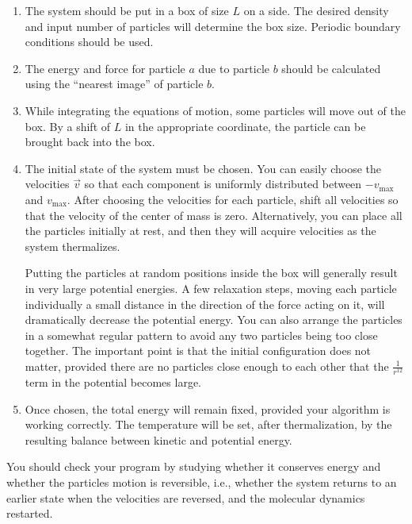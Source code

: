 \begin{enumerate}
    \item The system should be put in a box of size \(L\) on a side. The desired density and
          input number of particles will determine the box size. Periodic boundary
          conditions should be used.
    \item The energy and force for particle \(a\) due to particle \(b\) should be calculated
          using the ``nearest image'' of particle \(b\).
    \item While integrating the equations of motion, some particles will move out of the
          box. By a shift of \(L\) in the appropriate coordinate, the particle can be brought
          back into the box.
    \item The initial state of the system must be chosen. You can easily choose the
          velocities \(\vec{v}\) so that each component is uniformly distributed between
          \(-v_\text{max}\) and \(v_\text{max}\). After choosing the velocities for each
          particle, shift all velocities so that the velocity of the center of mass is zero.
          Alternatively, you can place all the particles initially at rest, and then they
          will acquire velocities as the system thermalizes.

          Putting the particles at random positions inside the box will generally result in
          very large potential energies. A few relaxation steps, moving each particle
          individually a small distance in the direction of the force acting on it, will
          dramatically decrease the potential energy. You can also arrange the particles in
          a somewhat regular pattern to avoid any two particles being too close together.
          The important point is that the initial configuration does not matter, provided
          there are no particles close enough to each other that the \(\frac{ 1 }{ r^{12} }\)
          term in the potential becomes large.
    \item Once chosen, the total energy will remain fixed, provided your algorithm is
          working correctly. The temperature will be set, after thermalization, by the
          resulting balance between kinetic and potential energy.
\end{enumerate}

You should check your program by studying whether it conserves energy and whether the
particles motion is reversible, i.e., whether the system returns to an earlier state when
the velocities are reversed, and the molecular dynamics restarted.

